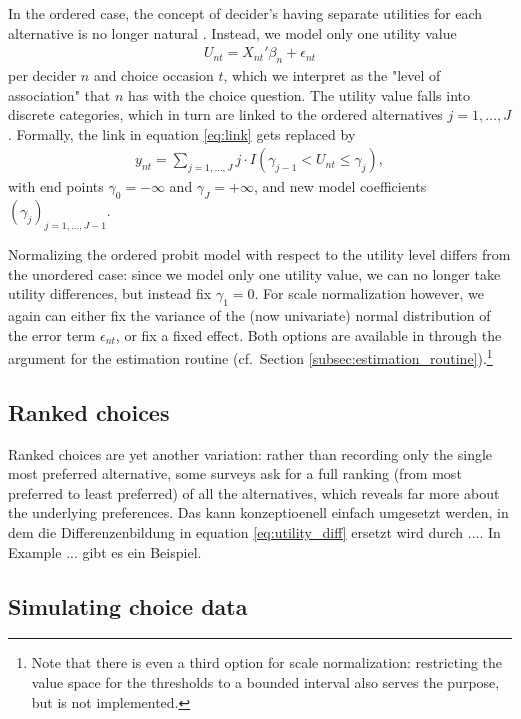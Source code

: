 \documentclass[article,shortnames]{jss}
\newcommand{\fct}[1]{\code{#1()}}
\begin{document}
In the ordered case, the concept of decider's having separate utilities for each alternative is no longer natural \citep[Ch.\ 7.4]{Train:2009}. Instead, we model only one utility value
\begin{align*}
  U_{nt} = X_{nt}'\beta_n + \epsilon_{nt}
\end{align*}
per decider $n$ and choice occasion $t$, which we interpret as the "level of association" that $n$ has with the choice question. The utility value falls into discrete categories, which in turn are linked to the ordered alternatives $j=1,\dots,J$. Formally, the link in equation \eqref{eq:link} gets replaced by
\begin{align*}
   y_{nt} = \sum_{j = 1,\dots,J} j \cdot I(\gamma_{j-1} < U_{nt} \leq \gamma_{j}),
\end{align*}
with end points $\gamma_0 = -\infty$ and $\gamma_J = +\infty$, and new model coefficients $(\gamma_j)_{j=1,\dots,J-1}$.

Normalizing the ordered probit model with respect to the utility level differs from the unordered case: since we model only one utility value, we can no longer take utility differences, but instead fix $\gamma_1 = 0$. For scale normalization however, we again can either fix the variance of the (now univariate) normal distribution of the error term $\epsilon_{nt}$, or fix a fixed effect. Both options are available in  through the  argument for the estimation routine \fct{fit\_model} (cf.\ Section \ref{subsec:estimation_routine}).\footnote{Note that there is even a third option for scale normalization: restricting the value space for the thresholds to a bounded interval also serves the purpose, but is not implemented.}

\subsection{Ranked choices} \label{subsec:ranked_choices}

Ranked choices are yet another variation: rather than recording only the single most preferred alternative, some surveys ask for a full ranking (from most preferred to least preferred) of all the alternatives, which reveals far more about the underlying preferences. Das kann konzeptioenell einfach umgesetzt werden, in dem die Differenzenbildung in equation \eqref{eq:utility_diff} ersetzt wird durch .... In Example ... gibt es ein Beispiel.

\subsection{Simulating choice data} \label{subsec:simulate_choice_data}
\end{document}
